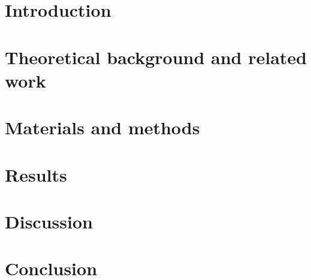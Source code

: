 \documentclass[pdflatex,sn-mathphys-num,iicol]{sn-jnl}
\begin{document}


\maketitle

\section{Introduction}\label{sec:intro}


\section{Theoretical background and related work}\label{sec:background}


\section{Materials and methods}\label{sec:methods}



\section{Results}\label{sec:results}


\section{Discussion}\label{sec:discussion}


\section{Conclusion}\label{sec:conclusion}





\end{document}
